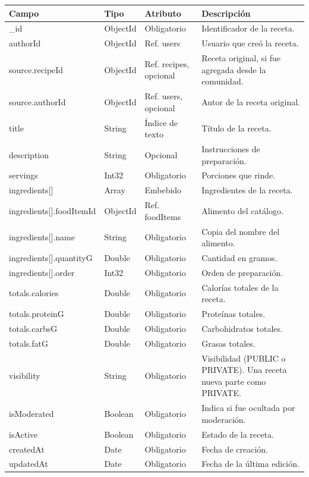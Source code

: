 {\footnotesize
\renewcommand{\arraystretch}{1.2}
\begin{longtable}{|>{\raggedright\arraybackslash}p{4.7cm}|>{\raggedright\arraybackslash}p{1.8cm}|>{\raggedright\arraybackslash}p{2.3cm}|>{\raggedright\arraybackslash}p{5.4cm}|}
    \hline
    \rowcolor[HTML]{EFEFEF}
    \textbf{Campo} & \textbf{Tipo} & \textbf{Atributo} & \textbf{Descripción} \\ \hline
    \endhead
    \_id & ObjectId & Obligatorio & Identificador de la receta. \\ \hline
    authorId & ObjectId & Ref. users & Usuario que creó la receta. \\ \hline
    source.\allowbreak recipeId & ObjectId & Ref. recipes, opcional & Receta original, si fue agregada desde la comunidad. \\ \hline
    source.\allowbreak authorId & ObjectId & Ref. users, opcional & Autor de la receta original. \\ \hline
    title & String & Índice de texto & Título de la receta. \\ \hline
    description & String & Opcional & Instrucciones de preparación. \\ \hline
    servings & Int32 & Obligatorio & Porciones que rinde. \\ \hline
    ingredients[]\allowbreak  & Array & Embebido & Ingredientes de la receta. \\ \hline
    ingredients[]\allowbreak .\allowbreak foodItemId & ObjectId & Ref. foodItems & Alimento del catálogo. \\ \hline
    ingredients[]\allowbreak .\allowbreak name & String & Obligatorio & Copia del nombre del alimento. \\ \hline
    ingredients[]\allowbreak .\allowbreak quantityG & Double & Obligatorio & Cantidad en gramos. \\ \hline
    ingredients[]\allowbreak .\allowbreak order & Int32 & Obligatorio & Orden de preparación. \\ \hline
    totals.\allowbreak calories & Double & Obligatorio & Calorías totales de la receta. \\ \hline
    totals.\allowbreak proteinG & Double & Obligatorio & Proteínas totales. \\ \hline
    totals.\allowbreak carbsG & Double & Obligatorio & Carbohidratos totales. \\ \hline
    totals.\allowbreak fatG & Double & Obligatorio & Grasas totales. \\ \hline
    visibility & String & Obligatorio & Visibilidad (PUBLIC o PRIVATE). Una receta nueva parte como PRIVATE. \\ \hline
    isModerated & Boolean & Obligatorio & Indica si fue ocultada por moderación. \\ \hline
    isActive & Boolean & Obligatorio & Estado de la receta. \\ \hline
    createdAt & Date & Obligatorio & Fecha de creación. \\ \hline
    updatedAt & Date & Obligatorio & Fecha de la última edición. \\ \hline
\end{longtable}
}
